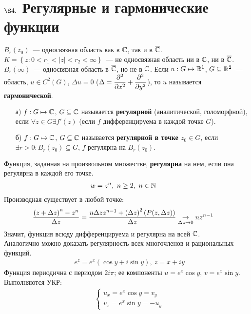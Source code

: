 \section{$\S 4.$ Регулярные и гармонические функции}
\example
$B_r(z_0)$~--- односвязная область как в $\mathbb{C}$, так и в $\overline{\mathbb{C}}$.
\example
$K = \left\{ z: 0 < r_1 < \left| z \right| < r_2 < \infty \right\}$~--- не
односвязная область ни в $\mathbb{C}$, ни в $\overline{\mathbb{C}}$.
\example
$B_r(\infty)$~--- односвязная область в $\overline{\mathbb{C}}$, но не в $\mathbb{C}$.
\Def
Если $u:G \mapsto \mathbb{R}^1$, $G \subseteq \mathbb{R}^2$~--- область, $u \in C^2(G)$,
$\Delta u = 0$ ($\Delta = \displaystyle \frac{\partial^2}{\partial x^2} + \displaystyle
\frac{\partial^2}{\partial y^2}$), то $u$ называется \textbf{гармонической}.
\Def
\begin{itemize}
    \item[а)]$f: G \mapsto \mathbb{C}$, $G \subseteq \mathbb{C}$ называется
    \textbf{регулярной} (аналитической, голоморфной), если $\forall z \in G
    \exists f'(z)$ (если $f$ дифференцируема в каждой точке $G$).
    \item[б)]$f: G \mapsto \mathbb{C}$, $G \subseteq \mathbb{C}$ называется
    \textbf{регулярной в точке $z_0 \in G$}, если $\exists r > 0: B_r(z_0)
    \subseteq G$, $f$ регулярна на $B_r(z_0)$.
\end{itemize}
\Def
Функция, заданная на произвольном множестве, \textbf{регулярна} на нем, если она
регулярна в каждой его точке.
\Example
\begin{align*}
  & w = z^n, \ n \geq 2, \ n \in \mathbb{N}
\end{align*}
Производная существует в любой точке:
\begin{align*}
  & \frac{\left( z+\Delta z \right)^n - z^n}{\Delta z} = \frac{n\Delta z z^{n-1} + \left( \Delta z \right)^2\left( P(z, \Delta z) \right)}{\Delta z} \underset{\Delta z \to 0}{\to} nz^{n-1}
\end{align*}
Значит, функция всюду дифференцируема и регулярна на всей $\mathbb{C}$.
\\
Аналогично можно доказать регулярность всех многочленов и рациональных функций.
\Def
\begin{align*}
  & e^z = e^x\left( \cos y + i \sin y \right), \ z = x+iy
\end{align*}
Функция периодична с периодом $2 i \pi$; ее компоненты $u = e^x \cos y$, $v =
e^x \sin y$.
Выполняются УКР:
\begin{align*}
  & \left\{ \begin{matrix}
          u_x = e^x \cos y = v_y \\
          v_x = e^x \sin y = -u_y
      \end{matrix} \right.
\end{align*}
